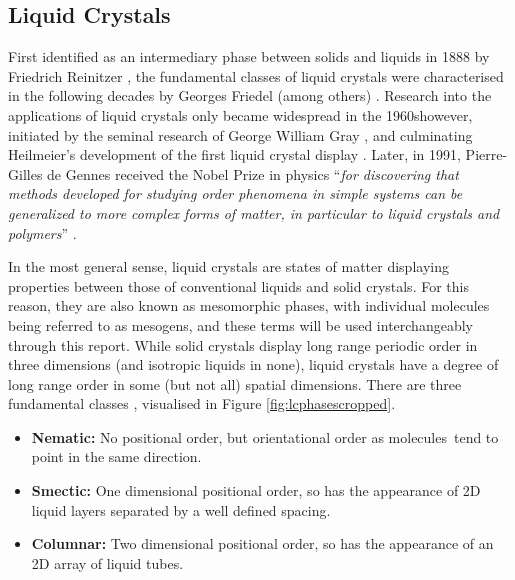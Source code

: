 \documentclass[11pt, a4paper]{article} %
\providecommand{\DIFadd}[1]{{\protect\color{blue}\uwave{#1}}} %
\providecommand{\DIFaddbegin}{} %
\providecommand{\DIFaddend}{} %
\begin{document}
\subsection{Liquid Crystals}

First identified as an intermediary phase between solids and liquids in 1888 by Friedrich Reinitzer \cite{Reinitzer1888}, the fundamental classes of liquid crystals were characterised in the following decades by Georges Friedel (among others) \cite{Friedel1922}. Research into the applications of liquid crystals only became widespread in the 1960s\DIFaddbegin \DIFadd{, }\DIFaddend however, initiated by the seminal research of George William Gray \cite{Gray1962}, and culminating Heilmeier's development of the first liquid crystal display \cite{Heilmeier1969, Heilmeier1968}. Later, in 1991, Pierre-Gilles de Gennes  received the Nobel Prize in physics ``\textit{for discovering that methods developed for studying order phenomena in simple systems can be generalized to more complex forms of matter, in particular to liquid crystals and polymers}'' \cite{DeGennes1992}.

In the most general sense, liquid crystals are states of matter displaying properties between those of conventional liquids and solid crystals. For this reason, they are also known as mesomorphic phases, with individual molecules being referred to as mesogens, and these terms will be used interchangeably through this report. While solid crystals display long range periodic order in three dimensions (and isotropic liquids in none), liquid crystals have a degree of long range order in some (but not all) spatial dimensions. There are three fundamental classes \cite{DeGennes1993}, visualised in Figure \ref{fig:lcphasescropped}.

\begin{itemize}
	\item \textbf{Nematic:} No positional order, but orientational order as molecules\footnotemark \ tend to point in the same direction.
	\item \textbf{Smectic:} One dimensional positional order, so has the appearance of 2D liquid layers separated by a well defined spacing.
	\item \textbf{Columnar:} Two dimensional positional order, so has the appearance of an 2D array of liquid tubes.
\end{itemize}

\end{document}
